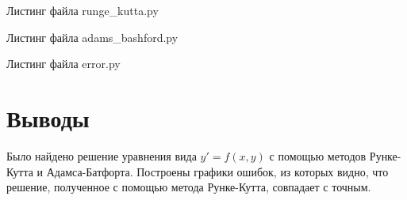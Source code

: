 Листинг файла runge\_kutta.py
\lstset{inputencoding=utf8, extendedchars=\true}


 Листинг файла adams\_bashford.py
 \lstset{inputencoding=utf8, extendedchars=\true}
 

Листинг файла error.py
\lstset{inputencoding=utf8, extendedchars=\true}


\chapter*{Выводы}

Было найдено решение уравнения вида $y' = f \left( x, y \right) $
с помощью методов Рунке-Кутта и Адамса-Батфорта.
Построены графики ошибок, из которых видно, что решение, полученное с помощью метода Рунке-Кутта,
совпадает с точным.


